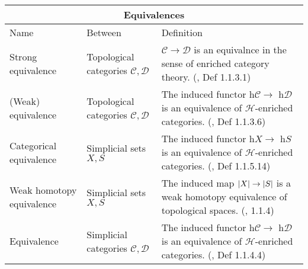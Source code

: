 \documentclass{article}
\begin{document}
\begin{centre}
\text{}

\text{}

\begin{tabular}{ |p{5cm}||p{5cm}|p{7cm}|}
 \hline
 \multicolumn{3}{|c|}{Equivalences}\\
 \hline
 Name& Between & Definition\\
  \hline\hline
    Strong equivalence & Topological categories \(\mathcal{C}, \mathcal{D}\) & \(\mathcal{C} \to \mathcal{D}\) is an equivalnce in the sense of enriched category theory. (\autocite{htt}, Def 1.1.3.1)\\
 \hline
  (Weak) equivalence & Topological categories \(\mathcal{C}, \mathcal{D}\) & The induced functor h\(\mathcal{C} \to\) h\(\mathcal{D}\) is an equivalence of \(\mathcal{H}\)-enriched categories. (\autocite{htt}, Def 1.1.3.6)\\
  \hline
  Categorical equivalence & Simplicial sets \(X, S\) & The induced functor h\(X \to\) h\(S\) is an equivalence of \(\mathcal{H}\)-enriched categories. (\autocite{htt}, Def 1.1.5.14)\\
\hline 
 Weak homotopy equivalence & Simplicial sets \(X, S\) & The induced map \(\lvert X\rvert \to \lvert S\rvert\) is a weak homotopy equivalence of topological spaces. (\autocite{htt}, 1.1.4)\\
 \hline
 Equivalence & Simplicial categories \(\mathcal{C}, \mathcal{D}\) &The induced functor h\(\mathcal{C} \to\) h\(\mathcal{D}\) is an equivalence of \(\mathcal{H}\)-enriched categories. (\autocite{htt}, Def 1.1.4.4)\\
\hline
\end{tabular}

\text{}

\text{}


\end{centre}
\end{document}
